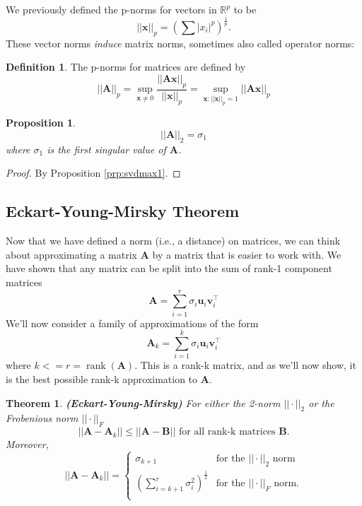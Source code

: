 \documentclass[]{book}
\newtheorem{theorem}{Theorem}[chapter]
\newtheorem{proposition}{Proposition}[chapter]
\theoremstyle{definition}
\newtheorem{definition}{Definition}[chapter]
\theoremstyle{definition}
\theoremstyle{definition}
\theoremstyle{remark}
\begin{document}
We previously defined the p-norms for vectors in \(\mathbb{R}^p\) to be
\[||\mathbf x||_p = \left(\sum |x_i|^p\right)^{\frac{1}{p}}.\]
These vector norms \emph{induce} matrix norms, sometimes also called operator norms:
\begin{definition}
\protect\hypertarget{def:matrixnorm}{}{\label{def:matrixnorm} }The p-norms for matrices are defined by
\[||\mathbf A||_p = \sup_{\mathbf x\not=0} \frac{||\mathbf A\mathbf x||_p}{||\mathbf x||_p} = \sup_{\mathbf x: ||\mathbf x||_p=1} ||\mathbf A\mathbf x||_p\]
\end{definition}

\begin{proposition}
\protect\hypertarget{prp:L2matrixnorm}{}{\label{prp:L2matrixnorm} }\[||\mathbf A||_2 = \sigma_1\]
where \(\sigma_1\) is the first singular value of \(\mathbf A\).
\end{proposition}
\begin{proof}
{}By Proposition \ref{prp:svdmax1}.
\end{proof}

\hypertarget{eckart-young-mirsky-theorem}{%
\subsection{Eckart-Young-Mirsky Theorem}\label{eckart-young-mirsky-theorem}}

Now that we have defined a norm (i.e., a distance) on matrices, we can think about approximating a matrix \(\mathbf A\) by a matrix that is easier to work with. We have shown that any matrix can be split into the sum of rank-1 component matrices
\[\mathbf A= \sum_{i=1}^r \sigma_i \mathbf u_i \mathbf v_i^\top\]
We'll now consider a family of approximations of the form
\begin{equation}
\mathbf A_k = \sum_{i=1}^k \sigma_i \mathbf u_i \mathbf v_i^\top
\label{eq:svdreduced}
\end{equation}
where \(k<=r=\operatorname{rank}(\mathbf A)\). This is a rank-k matrix, and as we'll now show, it is the best possible rank-k approximation to \(\mathbf A\).

\begin{theorem}
\protect\hypertarget{thm:Eckart-Young}{}{\label{thm:Eckart-Young} }\textbf{(Eckart-Young-Mirsky)} For either the 2-norm \(||\cdot||_2\) or the Frobenious norm \(||\cdot||_F\)
\[||\mathbf A-\mathbf A_k|| \leq ||\mathbf A-\mathbf B|| \mbox{ for all rank-k matrices }\mathbf B.\]
Moreover,
\[||\mathbf A-\mathbf A_k|| =\begin{cases}
\sigma_{k+1} &\mbox{for the }||\cdot||_2 \mbox{ norm}\\
\left(\sum_{i=k+1}^r \sigma_{i}^2\right)^{\frac{1}{2}} &\mbox{for the }||\cdot||_F \mbox{ norm.}\\
\end{cases}\]
\end{theorem}
\end{document}
